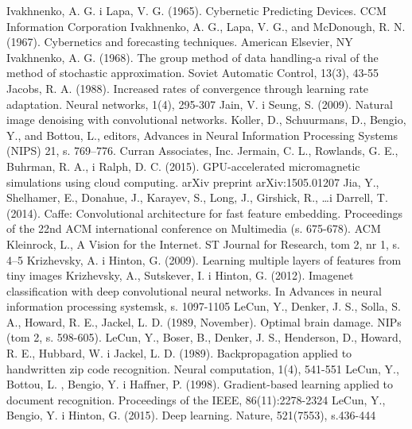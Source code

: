 \documentclass[12pt,a4paper,twoside]{article}
\begin{document}
\begin{thebibliography}{99}
 Ivakhnenko, A. G. i Lapa, V. G. (1965). Cybernetic Predicting Devices. CCM Information Corporation
 Ivakhnenko, A. G., Lapa, V. G., and McDonough, R. N. (1967). Cybernetics and forecasting techniques. American Elsevier, NY
 Ivakhnenko, A. G. (1968). The group method of data handling-a rival of the method of stochastic approximation. Soviet Automatic Control, 13(3), 43-55
 Jacobs, R. A. (1988). Increased rates of convergence through learning rate adaptation. Neural networks, 1(4), 295-307
 Jain, V. i Seung, S. (2009). Natural image denoising with convolutional networks. Koller, D., Schuurmans, D., Bengio, Y., and Bottou, L., editors, Advances in Neural Information Processing Systems (NIPS) 21, s. 769–776. Curran Associates, Inc.
 Jermain, C. L., Rowlands, G. E., Buhrman, R. A., i Ralph, D. C. (2015). GPU-accelerated micromagnetic simulations using cloud computing. arXiv preprint arXiv:1505.01207
 Jia, Y., Shelhamer, E., Donahue, J., Karayev, S., Long, J., Girshick, R., \ldots i Darrell, T. (2014). Caffe: Convolutional architecture for fast feature embedding. Proceedings of the 22nd ACM international conference on Multimedia (s. 675-678). ACM
 Kleinrock, L., A Vision for the Internet. ST Journal for Research, tom 2, nr 1, s. 4–5
 Krizhevsky, A. i Hinton, G. (2009). Learning multiple layers of features from tiny images
 Krizhevsky, A., Sutskever, I. i Hinton, G. (2012). Imagenet classification with deep convolutional neural networks. In Advances in neural information processing systemsk, s. 1097-1105
 LeCun, Y., Denker, J. S., Solla, S. A., Howard, R. E., Jackel, L. D. (1989, November). Optimal brain damage. NIPs (tom 2, s. 598-605).
 LeCun, Y., Boser, B., Denker, J. S., Henderson, D., Howard, R. E., Hubbard, W. i Jackel, L. D. (1989). Backpropagation applied to handwritten zip code recognition. Neural computation, 1(4), 541-551
 LeCun, Y., Bottou, L. , Bengio, Y. i Haffner, P. (1998). Gradient-based learning applied to document recognition. Proceedings of the IEEE, 86(11):2278-2324
 LeCun, Y., Bengio, Y. i Hinton, G. (2015). Deep learning. Nature, 521(7553), s.436-444

\end{thebibliography}
\end{document}
